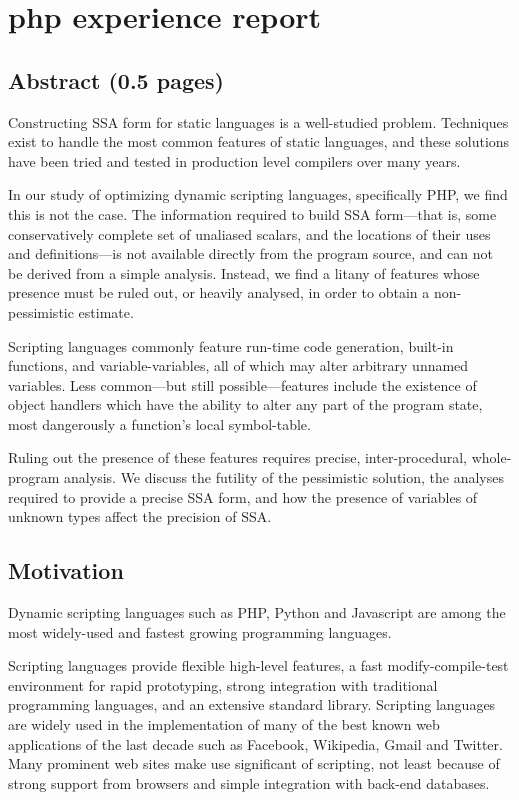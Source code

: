 \chapter{php experience report }


\section{Abstract (0.5 pages)}

Constructing SSA form for static languages is a well-studied problem.
Techniques exist to handle the most common features of static languages, and these solutions have been tried and tested in production level compilers over many years.

In our study of optimizing dynamic scripting languages, specifically PHP, we find this is not the case.
The information required to build SSA form---that is, some conservatively complete set of unaliased scalars, and the locations of their uses and definitions---is not available directly from the program source, and can not be derived from a simple analysis.
Instead, we find a litany of features whose presence must be ruled out, or heavily analysed, in order to obtain a non-pessimistic estimate.

Scripting languages commonly feature run-time code generation, built-in functions, and variable-variables, all of which may alter arbitrary unnamed variables.
Less common---but still possible---features include the existence of object handlers which have the ability to alter any part of the program state, most dangerously a function's local symbol-table.

Ruling out the presence of these features requires precise, inter-procedural, whole-program analysis.
We discuss the futility of the pessimistic solution, the analyses required to provide a precise SSA form, and how the presence of variables of unknown types affect the precision of SSA.

\section{Motivation}

Dynamic scripting languages such as PHP, Python and Javascript are among the most widely-used and fastest growing programming languages.

Scripting languages provide flexible high-level features, a fast modify-compile-test environment for rapid prototyping, strong integration with traditional programming languages, and an extensive standard library.
Scripting languages are widely used in the implementation of many of the best known web applications of the last decade such as Facebook, Wikipedia, Gmail and Twitter.
Many prominent web sites make use significant of scripting, not least because of strong support from browsers and simple integration with back-end databases.

